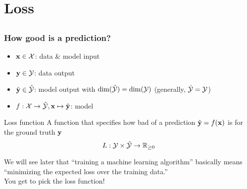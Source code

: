 \section{Loss}

\subsection{}

\begin{frame}
    \frametitle{How good is a prediction?}

    \begin{itemize}
        \item<+-> $\mathbf{x} \in \mathcal{X}$: data \& model input
        \item $\mathbf{y} \in \mathcal{Y}$: data output
        \item $\hat{\mathbf{y}} \in \hat{\mathcal{Y}}$: model output with $\dim(\hat{\mathcal{Y}}) = \dim(\mathcal{Y})$ (generally, $\hat{\mathcal{Y}} = \mathcal{Y}$)
        \item $f : \mathcal{X} \to \hat{\mathcal{Y}}, \mathbf{x} \mapsto \hat{\mathbf{y}}$: model
    \end{itemize}
    \pause

    \begin{block}{Loss function}
        A function that specifies how bad of a prediction $\hat{\mathbf{y}} = f(\mathbf{x})$ is for the ground truth $\mathbf{y}$
        \begin{equation*}
            L : \mathcal{Y} \times \hat{\mathcal{Y}} \to \mathbb{R}_{\ge 0}
        \end{equation*}
    \end{block}
    \pause

    We will see later that ``training a machine learning algorithm'' basically means ``minimizing the expected loss over the training data.'' \\[1ex]

    You get to pick the loss function!
\end{frame}

